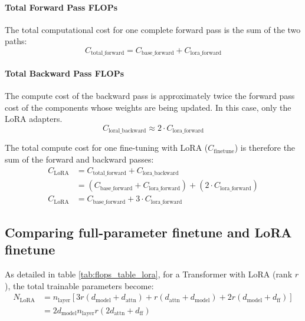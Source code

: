 \documentclass{article} %
\begin{document}
\paragraph{Total Forward Pass FLOPs}
The total computational cost for one complete forward pass is the sum of the two paths:
\begin{equation}
    C_{\text{total\_forward}} = C_{\text{base\_forward}} + C_{\text{lora\_forward}}
\end{equation}



\paragraph{Total Backward Pass FLOPs} The compute cost of the backward pass is approximately twice the forward pass cost of the components whose weights are being updated. In this case, only the LoRA adapters.
$$ C_{\text{loral\_backward}} \approx 2 \cdot C_{\text{lora\_forward}} $$

The total compute cost for one fine-tuning with LoRA ($C_{\text{finetune}}$) is therefore the sum of the forward and backward passes:
\begin{align}
    C_{\text{LoRA}} &= C_{\text{total\_forward}} + C_{\text{lora\_backward}} \nonumber \\
    &= (C_{\text{base\_forward}} + C_{\text{lora\_forward}}) + (2 \cdot C_{\text{lora\_forward}}) \nonumber \\
    C_{\text{LoRA}} &= C_{\text{base\_forward}} + 3 \cdot C_{\text{lora\_forward}}
\end{align}

\subsection{Comparing full-parameter finetune and LoRA finetune}
\label{app:lora_comparison}



As detailed in table \ref{tab:flops_table_lora}, for a Transformer with LoRA (rank $r$), the total trainable parameters become:
\begin{equation}
\begin{aligned}
N_{\text{LoRA}} &= n_{\text{layer}} \left[ 3r(d_{\text{model}} + d_{\text{attn}}) + r(d_{\text{attn}} + d_{\text{model}}) + 2r(d_{\text{model}} + d_{\text{ff}}) \right] \\
&= 2d_{\text{model}}n_{\text{layer}}r(2d_{\text{attn}} + d_{\text{ff}})
\end{aligned}
\end{equation}
\end{document}
